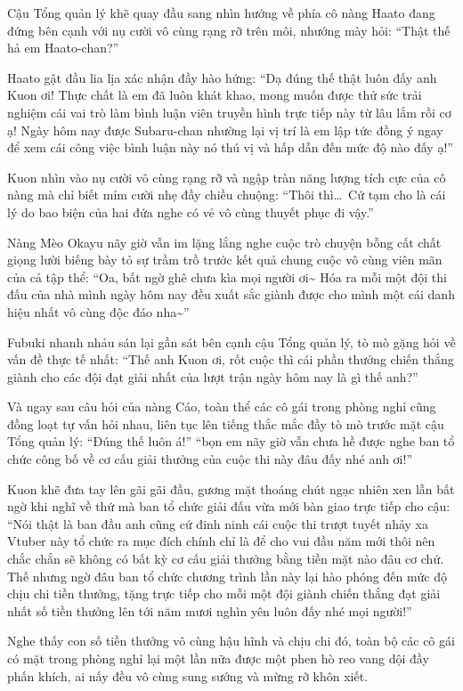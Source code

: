 \documentclass[../main.tex]{subfiles}
\begin{document}
Cậu Tổng quản lý khẽ quay đầu sang nhìn hướng về phía cô nàng Haato đang đứng bên cạnh với nụ cười vô cùng rạng rỡ trên môi, nhướng mày hỏi: ``Thật thế hả em Haato-chan?''

Haato gật đầu lia lịa xác nhận đầy hào hứng: ``Dạ đúng thế thật luôn đấy anh Kuon ơi! Thực chất là em đã luôn khát khao, mong muốn được thử sức trải nghiệm cái vai trò làm bình luận viên truyền hình trực tiếp này từ lâu lắm rồi cơ ạ! Ngày hôm nay được Subaru-chan nhường lại vị trí là em lập tức đồng ý ngay để xem cái công việc bình luận này nó thú vị và hấp dẫn đến mức độ nào đấy ạ!''

Kuon nhìn vào nụ cười vô cùng rạng rỡ và ngập tràn năng lượng tích cực của cô nàng mà chỉ biết mỉm cười nhẹ đầy chiều chuộng: ``Thôi thì\dots\ Cứ tạm cho là cái lý do bao biện của hai đứa nghe có vẻ vô cùng thuyết phục đi vậy.''

Nàng Mèo Okayu nãy giờ vẫn im lặng lắng nghe cuộc trò chuyện bỗng cất chất giọng lười biếng bày tỏ sự trầm trồ trước kết quả chung cuộc vô cùng viên mãn của cả tập thể: ``Oa, bất ngờ ghê chưa kìa mọi người ơi\~{} Hóa ra mỗi một đội thi đấu của nhà mình ngày hôm nay đều xuất sắc giành được cho mình một cái danh hiệu nhất vô cùng độc đáo nha\~{}''

Fubuki nhanh nhảu sán lại gần sát bên cạnh cậu Tổng quản lý, tò mò gặng hỏi về vấn đề thực tế nhất: ``Thế anh Kuon ơi, rốt cuộc thì cái phần thưởng chiến thắng giành cho các đội đạt giải nhất của lượt trận ngày hôm nay là gì thế anh?''

Và ngay sau câu hỏi của nàng Cáo, toàn thể các cô gái trong phòng nghỉ cũng đồng loạt tự vấn hỏi nhau, liên tục lên tiếng thắc mắc đầy tò mò trước mặt cậu Tổng quản lý: ``Đúng thế luôn á!'' ``bọn em nãy giờ vẫn chưa hề được nghe ban tổ chức công bố về cơ cấu giải thưởng của cuộc thi này đâu đấy nhé anh ơi!''

Kuon khẽ đưa tay lên gãi gãi đầu, gương mặt thoáng chút ngạc nhiên xen lẫn bất ngờ khi nghĩ về thứ mà ban tổ chức giải đấu vừa mới bàn giao trực tiếp cho cậu: ``Nói thật là ban đầu anh cũng cứ đinh ninh cái cuộc thi trượt tuyết nhảy xa Vtuber này tổ chức ra mục đích chính chỉ là để cho vui đầu năm mới thôi nên chắc chắn sẽ không có bất kỳ cơ cấu giải thưởng bằng tiền mặt nào đâu cơ chứ. Thế nhưng ngờ đâu ban tổ chức chương trình lần này lại hào phóng đến mức độ chịu chi tiền thưởng, tặng trực tiếp cho mỗi một đội giành chiến thắng đạt giải nhất số tiền thưởng lên tới năm mươi nghìn yên luôn đấy nhé mọi người!''

Nghe thấy con số tiền thưởng vô cùng hậu hĩnh và chịu chi đó, toàn bộ các cô gái có mặt trong phòng nghỉ lại một lần nữa được một phen hò reo vang dội đầy phấn khích, ai nấy đều vô cùng sung sướng và mừng rỡ khôn xiết.
\end{document}
